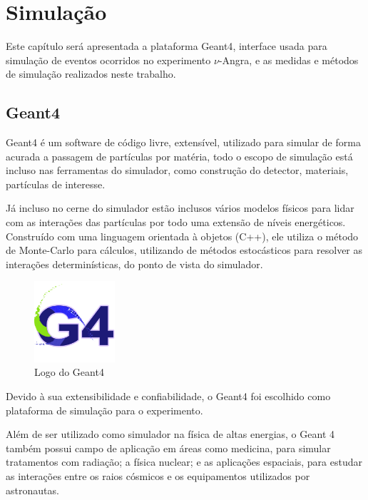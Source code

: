 \chapter{Simulação} \label{cap:simulacao}
\vspace{-2cm}

Este capítulo será apresentada a plataforma \ac{Geant4}, interface usada para simulação de eventos ocorridos no experimento $\nu$-Angra, e as medidas e métodos de simulação realizados neste trabalho.

\section{Geant4}

Geant4 é um software de código livre, extensível,  utilizado para simular de forma acurada a passagem de partículas por matéria, todo o escopo de simulação está incluso nas ferramentas do simulador, como construção do detector, materiais, partículas de interesse.

Já incluso no cerne do simulador estão inclusos vários modelos físicos para lidar com as interações das partículas por todo uma extensão de níveis energéticos. Construído com uma linguagem orientada à objetos (C++), ele utiliza o método de Monte-Carlo para cálculos, utilizando de métodos estocásticos para resolver as interações determinísticas, do ponto de vista do simulador.

\begin{figure}[H]
	\centering
	\includegraphics[width=3cm]{textuais/simulacao/figuras/g4.png}
	\caption{Logo do Geant4}
	\label{fig:logo}
\end{figure}

Devido à sua extensibilidade e confiabilidade, o Geant4 foi escolhido como plataforma de simulação para o experimento.

Além de ser utilizado como simulador na física de altas energias, o Geant 4 também possui campo de aplicação em áreas como medicina, para simular tratamentos com radiação; a física nuclear; e as aplicações espaciais, para estudar as interações entre os raios cósmicos e os equipamentos utilizados por astronautas.

